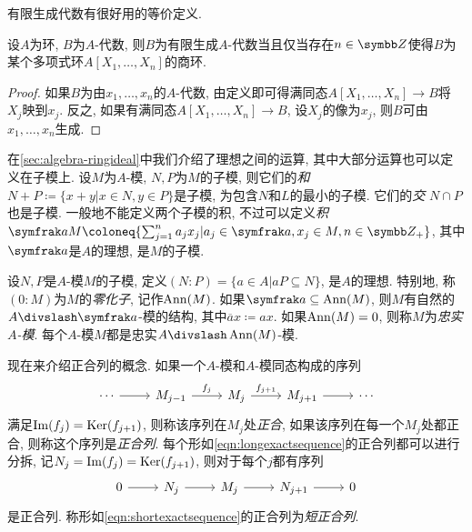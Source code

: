 有限生成代数有很好用的等价定义.

\begin{proposition}\label{prop:fgalgebra}
  设$A$为环, $B$为$A$-代数, 则$B$为有限生成$A$-代数当且仅当存在$n\in \ZZ$使得$B$为某个多项式环$A[X_1, \dotsc, X_n]$的商环.
\end{proposition}

\begin{proof}
  如果$B$为由$x_1, \dotsc, x_n$的$A$-代数, 由定义即可得满同态$A[X_1, \dotsc, X_n]\to B$将$X_j$映到$x_j$. 反之, 如果有满同态$A[X_1, \dotsc, X_n]\to B$, 设$X_j$的像为$x_j$, 则$B$可由$x_1, \dotsc, x_n$生成.
\end{proof}

在\ref{sec:algebra-ringideal}中我们介绍了理想之间的运算, 其中大部分运算也可以定义在子模上. 设$M$为$A$-模, $N, P$为$M$的子模, 则它们的\emph{和} $N+P\coloneq \{x+y\vert x\in N, y\in P\}$是子模, 为包含$N$和$L$的最小的子模. 它们的\emph{交} $N\cap P$也是子模. 一般地不能定义两个子模的积, 不过可以定义\emph{积} $\ideal{a}M\coloneq \{\sum_{j=1}^n a_jx_j\vert a_j\in\ideal{a}, x_j\in M, n\in\ZZ_+\}$, 其中$\ideal{a}$是$A$的理想, 是$M$的子模.

设$N, P$是$A$-模$M$的子模, 定义$(N{:}P)=\{a\in A\vert aP\subseteq N\}$, 是$A$的理想. 特别地, 称$(0{:}M)$为$M$的\emph{零化子}, 记作$\operatorname{Ann} (M)$. 如果$\ideal{a}\subseteq \Ann (M)$, 则$M$有自然的$A{\divslash}\ideal{a}$-模的结构, 其中$\overline{a}x\coloneq ax$. 如果$\operatorname{Ann} (M)=0$, 则称$M$为\emph{忠实$A$-模}. 每个$A$-模$M$都是忠实$A{\divslash}\Ann (M)$-模.

\begin{definition}
  现在来介绍正合列的概念. 如果一个$A$-模和$A$-模同态构成的序列
  \begin{equation}
    \begin{tikzcd}
      \dotsb \arrow[r] & M_{j-1} \arrow[r, "f_j"] & M_j \arrow[r, "f_{j+1}"] & M_{j+1} \arrow[r] & \dotsb\label{eqn:longexactsequence}
    \end{tikzcd}
  \end{equation}
  满足$\operatorname{Im} (f_j)=\operatorname{Ker} (f_{j+1})$, 则称该序列在$M_j$处\emph{正合}, 如果该序列在每一个$M_j$处都正合, 则称这个序列是\emph{正合列}. 每个形如\eqref{eqn:longexactsequence}的正合列都可以进行分拆, 记$N_j=\operatorname{Im} (f_j)=\operatorname{Ker} (f_{j+1})$, 则对于每个$j$都有序列
  \begin{equation}
    \begin{tikzcd}
      0 \arrow[r] & N_j \arrow[r] & M_j \arrow[r] & N_{j+1} \arrow[r] & 0\label{eqn:shortexactsequence}
    \end{tikzcd}
  \end{equation}
  是正合列. 称形如\eqref{eqn:shortexactsequence}的正合列为\emph{短正合列}.
\end{definition}

